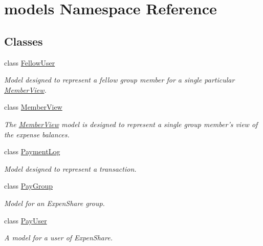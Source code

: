 \hypertarget{namespacemodels}{\section{models Namespace Reference}
\label{namespacemodels}
}
\subsection*{Classes}
\begin{DoxyCompactItemize}
\item 
class \hyperlink{classmodels_1_1_fellow_user}{Fellow\-User}
\begin{DoxyCompactList}\small\item\em Model designed to represent a fellow group member for a single particular \hyperlink{classmodels_1_1_member_view}{Member\-View}. \end{DoxyCompactList}\item 
class \hyperlink{classmodels_1_1_member_view}{Member\-View}
\begin{DoxyCompactList}\small\item\em The \hyperlink{classmodels_1_1_member_view}{Member\-View} model is designed to represent a single group member's view of the expense balances. \end{DoxyCompactList}\item 
class \hyperlink{classmodels_1_1_payment_log}{Payment\-Log}
\begin{DoxyCompactList}\small\item\em Model designed to represent a transaction. \end{DoxyCompactList}\item 
class \hyperlink{classmodels_1_1_pay_group}{Pay\-Group}
\begin{DoxyCompactList}\small\item\em Model for an Expen\-Share group. \end{DoxyCompactList}\item 
class \hyperlink{classmodels_1_1_pay_user}{Pay\-User}
\begin{DoxyCompactList}\small\item\em A model for a user of Expen\-Share. \end{DoxyCompactList}\end{DoxyCompactItemize}
